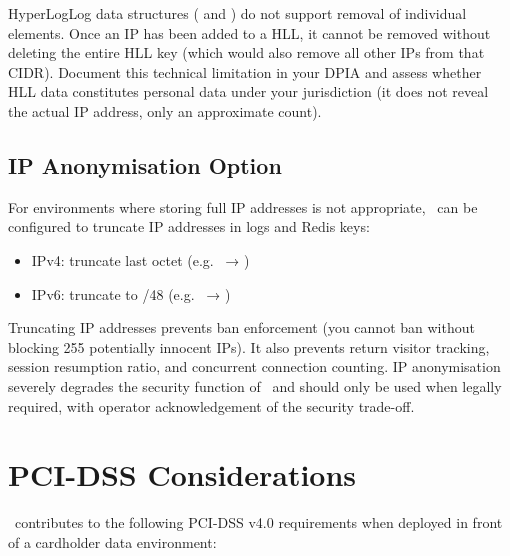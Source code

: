 \begin{warningbox}
HyperLogLog data structures ( and ) do not
support removal of individual elements. Once an IP has been added to a HLL, it cannot
be removed without deleting the entire HLL key (which would also remove all other
IPs from that CIDR). Document this technical limitation in your DPIA and assess
whether HLL data constitutes personal data under your jurisdiction (it does not
reveal the actual IP address, only an approximate count).
\end{warningbox}

\subsection{IP Anonymisation Option}

For environments where storing full IP addresses is not appropriate, \ja\ can be
configured to truncate IP addresses in logs and Redis keys:

\begin{itemize}
  \item IPv4: truncate last octet (e.g.\  → )
  \item IPv6: truncate to /48 (e.g.\  → )
\end{itemize}

\begin{dangerbox}
Truncating IP addresses prevents ban enforcement (you cannot ban 
without blocking 255 potentially innocent IPs). It also prevents return visitor
tracking, session resumption ratio, and concurrent connection counting. IP anonymisation
severely degrades the security function of \ja\ and should only be used when legally
required, with operator acknowledgement of the security trade-off.
\end{dangerbox}

\section{PCI-DSS Considerations}

\ja\ contributes to the following PCI-DSS v4.0 requirements when deployed in front
of a cardholder data environment:

